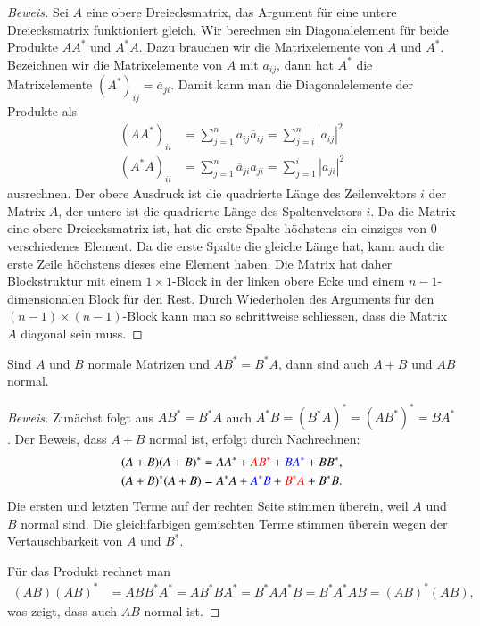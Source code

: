 \begin{proof}[Beweis]
Sei $A$ eine obere Dreiecksmatrix, das Argument für eine untere Dreiecksmatrix
funktioniert gleich.
Wir berechnen ein Diagonalelement für beide Produkte $AA^*$ und $A^*A$.
Dazu brauchen wir die Matrixelemente von $A$ und $A^*$.
Bezeichnen wir die Matrixelemente von $A$ mit $a_{i\!j}$, dann hat $A^*$
die Matrixelemente $(A^*)_{i\!j}=\overline{a}_{ji}$.
Damit kann man die Diagonalelemente der Produkte als
\begin{align*}
(AA^*)_{ii}
&=
\sum_{j=1}^n a_{i\!j}\overline{a}_{i\!j}
=
\sum_{j=i}^n |a_{i\!j}|^2
\\
(A^*A)_{ii}
&=
\sum_{j=1}^n \overline{a}_{ji}a_{ji}
=
\sum_{j=1}^i |a_{ji}|^2
\end{align*}
ausrechnen.
Der obere Ausdruck ist die quadrierte Länge des Zeilenvektors $i$ der Matrix $A$,
der untere ist die quadrierte Länge des Spaltenvektors $i$.
Da die Matrix eine obere Dreiecksmatrix ist, hat die erste Spalte höchstens
ein einziges von $0$ verschiedenes Element.
Da die erste Spalte die gleiche Länge hat,
kann auch die erste Zeile höchstens dieses eine Element haben.
Die Matrix hat daher Blockstruktur mit einem $1\times 1$-Block in der
linken obere Ecke und einem  $n-1$-dimensionalen Block für den Rest.
Durch Wiederholen des Arguments für den $(n-1)\times (n-1)$-Block 
kann man so schrittweise schliessen, dass die Matrix $A$ diagonal sein muss.
\end{proof}


\begin{satz}
Sind $A$ und $B$ normale Matrizen und $AB^*=B^*A$, dann sind auch $A+B$
und $AB$ normal.
\end{satz}

\begin{proof}[Beweis]
Zunächst folgt aus $AB^*=B^*A$ auch
$A^*B = (B^*A)^* = (AB^*)^* = BA^*$.
Der Beweis, dass $A+B$ normal ist, erfolgt durch Nachrechnen:
\begin{align*}
(A+B)(A+B)^*
&=
AA^* + {\color{red}AB^*} + {\color{blue}BA^*}+BB^*,
\\
(A+B)^*(A+B)
&=
A^*A + {\color{blue}A^*B} + {\color{red}B^*A} + B^*B.
\end{align*}
Die ersten und letzten Terme auf der rechten Seite stimmen überein, weil
$A$ und $B$ normal sind.
Die gleichfarbigen gemischten Terme stimmen überein wegen der
Vertauschbarkeit von $A$ und $B^*$.

Für das Produkt rechnet man
\begin{align*}
(AB)(AB)^*
&= ABB^*A^* = AB^*BA^*
= B^*AA^*B
=
B^*A^*AB
=
(AB)^*(AB),
\end{align*}
was zeigt, dass auch $AB$ normal ist.
\end{proof}

